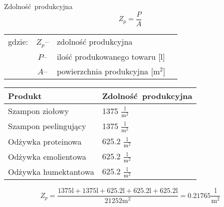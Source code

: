 \newpage

Zdolność produkcyjna
\begin{equation}
	Z_{p} = \frac{P}{A}
\end{equation}
\begin{tabular}{rcll}
	gdzie:&$Z_{p}$--&zdolność produkcyjna \\
	&$P$--&ilość produkowanego towaru [l] \\
	&$A$--&powierzchnia produkcyjna [$\mathrm{m^{2}}$] \\
\end{tabular}

\begin{center}
	\begin{tabular}{ll}
		\hline
		Produkt & Zdolność produkcyjna\\
		\hline\hline
		Szampon ziołowy & 1375 $\mathrm{\frac{l}{m^{2}}}$\\
		Szampon peelingujący & 1375 $\mathrm{\frac{l}{m^{2}}}$ \\
		Odżywka proteinowa & 625.2 $\mathrm{\frac{l}{m^{2}}}$ \\
		Odżywka emolientowa & 625.2 $\mathrm{\frac{l}{m^{2}}}$ \\
		Odżywka humektantowa & 625.2 $\mathrm{\frac{l}{m^{2}}}$ \\
		\hline
	\end{tabular}
\end{center}

\begin{equation}
	Z_{p} = \frac{1375\mathrm{l} + 1375\mathrm{l} + 625.2\mathrm{l} + 625.2\mathrm{l} + 625.2\mathrm{l}}{21252\mathrm{m^{2}}} = 0.21765 \frac{\mathrm{l}}{\mathrm{m^{2}}}
\end{equation}
